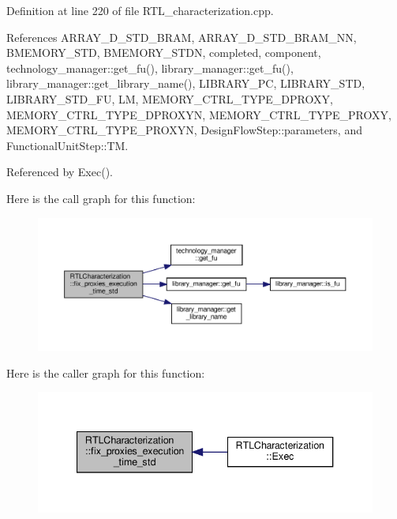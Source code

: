 Definition at line 220 of file R\+T\+L\+\_\+characterization.\+cpp.



References A\+R\+R\+A\+Y\+\_\+D\+\_\+\+S\+T\+D\+\_\+\+B\+R\+AM, A\+R\+R\+A\+Y\+\_\+D\+\_\+\+S\+T\+D\+\_\+\+B\+R\+A\+M\+\_\+\+NN, B\+M\+E\+M\+O\+R\+Y\+\_\+\+S\+TD, B\+M\+E\+M\+O\+R\+Y\+\_\+\+S\+T\+DN, completed, component, technology\+\_\+manager\+::get\+\_\+fu(), library\+\_\+manager\+::get\+\_\+fu(), library\+\_\+manager\+::get\+\_\+library\+\_\+name(), L\+I\+B\+R\+A\+R\+Y\+\_\+\+PC, L\+I\+B\+R\+A\+R\+Y\+\_\+\+S\+TD, L\+I\+B\+R\+A\+R\+Y\+\_\+\+S\+T\+D\+\_\+\+FU, LM, M\+E\+M\+O\+R\+Y\+\_\+\+C\+T\+R\+L\+\_\+\+T\+Y\+P\+E\+\_\+\+D\+P\+R\+O\+XY, M\+E\+M\+O\+R\+Y\+\_\+\+C\+T\+R\+L\+\_\+\+T\+Y\+P\+E\+\_\+\+D\+P\+R\+O\+X\+YN, M\+E\+M\+O\+R\+Y\+\_\+\+C\+T\+R\+L\+\_\+\+T\+Y\+P\+E\+\_\+\+P\+R\+O\+XY, M\+E\+M\+O\+R\+Y\+\_\+\+C\+T\+R\+L\+\_\+\+T\+Y\+P\+E\+\_\+\+P\+R\+O\+X\+YN, Design\+Flow\+Step\+::parameters, and Functional\+Unit\+Step\+::\+TM.



Referenced by Exec().

Here is the call graph for this function\+:
\nopagebreak
\begin{figure}[H]
\begin{center}
\leavevmode
\includegraphics[width=350pt]{d9/d84/classRTLCharacterization_a92793e13528e187fc9c662ebc5ef7abe_cgraph}
\end{center}
\end{figure}
Here is the caller graph for this function\+:
\nopagebreak
\begin{figure}[H]
\begin{center}
\leavevmode
\includegraphics[width=340pt]{d9/d84/classRTLCharacterization_a92793e13528e187fc9c662ebc5ef7abe_icgraph}
\end{center}
\end{figure}
\mbox{\label{classRTLCharacterization_a0b41ce2d4af25aa22e41dd9af50f1b0b}} 
